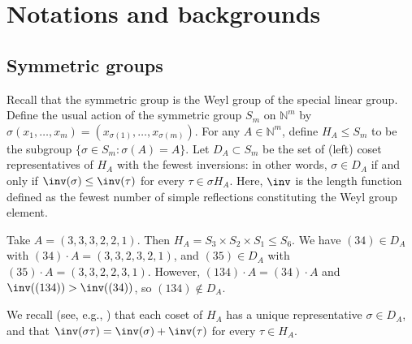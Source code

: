 \section{Notations and backgrounds}
\subsection{Symmetric groups}
Recall that the symmetric group is the Weyl group of the special linear group. Define the usual action of the symmetric group $S_m$ on $\mathbb{N}^m$ by $ \sigma(x_1,\dots,x_m)= (x_{\sigma(1)}, \dots, x_{\sigma(m)})$. For any $A\in \mathbb{N}^m$, define $ H_A \le S_m $ to be the subgroup $ \{\sigma \in S_m\colon \sigma(A)=A\}$. Let $ D_A \subset S_m $ be the set of (left) coset representatives of $H_A$ with the fewest inversions: in other words, $ \sigma \in D_A $ if and only if $ \inv (\sigma) \le \inv (\tau) $ for every $ \tau \in \sigma H_A$. Here, $\inv$ is the length function defined as the fewest number
of simple reflections constituting the Weyl group element.

 \begin{Example} Take $ A= (3,3,3,2,2,1).$ Then $H_A=S_3 \times S_2 \times S_1 \leq S_6$. We have $ (34) \in D_A $ with $ (34) \cdot A= (3,3,2,3,2,1)$, and $ (35) \in D_A $ with $ (35)\cdot A=(3,3,2,2,3,1) $. However, $ (134)\cdot A= (34) \cdot A$ and $\inv((134)) > \inv((34))$, so $ (134) \notin D_A $.
 \end{Example}

 We recall (see, e.g., \cite{Carter}) that each coset of $H_A$ has a unique representative $\sigma \in D_A$, and that $\inv(\sigma\tau) = \inv(\sigma) + \inv(\tau)$ for every $\tau \in H_A$.

